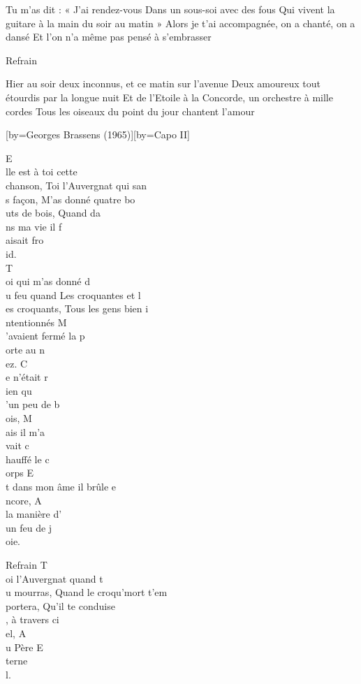 \beginverse
Tu m'as dit : « J'ai rendez-vous
Dans un sous-soi avec des fous
Qui vivent la guitare à la main du soir au matin »
Alors je t'ai accompagnée, on a chanté, on a dansé
Et l'on n'a même pas pensé à s'embrasser
\endverse

	Refrain

\beginverse
Hier au soir deux inconnus, et ce matin sur l'avenue 
Deux amoureux tout étourdis par la longue nuit 
Et de l'Etoile à la Concorde, un orchestre à mille cordes
Tous les oiseaux du point du jour chantent l'amour
\endverse

[by={Georges Brassens (1965)}][by={Capo II}]

\beginverse
E\\[Lam]lle est à toi cette\\[Mi7] chanson, 
Toi l'Auvergnat qui san\\[Lam]s façon,
M'as donné quatre bo\\[Mi7]uts de bois,
Quand da\\[Lam]ns ma vie il f\\[Sol7]aisait fro\\[Do]id.\\[Mi7]
T\\[Lam]oi qui m'as donné d\\[Mi7]u feu quand
Les croquantes et l\\[Lam]es croquants,
Tous les gens bien i\\[Mi7]ntentionnés
M\\[Lam]'avaient fermé la p\\[Sol7]orte au n\\[Do]ez.
C\\[Do7]e n'était r\\[Fa]ien qu\\[Sol7]'un peu de b\\[Do]ois,
M\\[Lam]ais il m'a\\[Rém]vait c\\[Mi7]hauffé le c\\[Lam]orps
E\\[Rém]t dans mon âme il brûle e\\[Lam]ncore,
A\\[Fa] la manière d'\\[Rém]un feu de j\\[Mi7]oie.
\endverse

	Refrain
T\\[Lam]oi l'Auvergnat quand t\\[Mi7]u mourras,
Quand le croqu'mort t'em\\[Lam]portera,
Qu'il te conduise\\[Ré], à travers ci\\[Sol]el,
A\\[Fa]u Père E\\[Mi7]terne\\[Lam]l.

